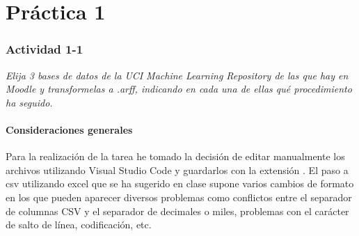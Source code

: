 \part{Práctica 1}
\section{Actividad 1-1}\label{p11}
\begin{center}
    \parbox{12cm}{\justify\textit{
        Elija 3 bases de datos de la UCI Machine Learning Repository de las que hay en Moodle y transformelas a .arff, indicando en cada una de ellas qué procedimiento ha seguido.
    }}
\end{center}

\subsection{Consideraciones generales}\label{ssc:consideraciones-generales}
Para la realización de la tarea he tomado la decisión de editar manualmente los archivos utilizando Visual Studio Code y guardarlos con la extensión . El paso a csv utilizando excel que se ha sugerido en clase supone varios cambios de formato en los que pueden aparecer diversos problemas como conflictos entre el separador de columnas CSV y el separador de decimales o miles, problemas con el carácter de salto de línea, codificación, etc.

